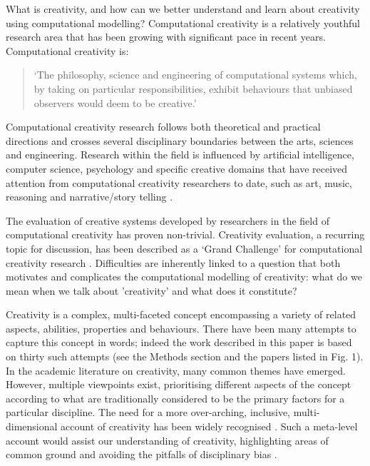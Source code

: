 \documentclass[10pt,letterpaper]{article}
\begin{document}
What is creativity, and how can we better understand and learn about creativity using computational modelling? Computational creativity is a relatively youthful research area that has been growing with significant pace in recent years. Computational creativity is: 
\begin{quote}`The philosophy, science and engineering of computational systems which, by taking on particular responsibilities, exhibit behaviours that unbiased observers would deem to be creative.' 
\cite[p. 21]{coltonwiggins12}
\end{quote}

Computational creativity research follows both theoretical and practical directions and crosses several disciplinary boundaries between the arts, sciences and engineering. Research within the field is influenced by artificial intelligence, computer science, psychology and specific creative domains that have received attention from computational creativity researchers to date, such as art, music, reasoning and narrative/story telling \cite[provide examples]{colton08,widmerAIM09,leon10MM,perezyperez99}. 

The evaluation of creative systems developed by researchers in the field of computational creativity has proven non-trivial. Creativity evaluation, a recurring topic for discussion, has been described as a `Grand Challenge' for computational creativity research \cite{cardoso09}. Difficulties are inherently linked to a question that both motivates and complicates the computational modelling of creativity: what  do we mean when we talk about 'creativity' and what does it constitute?

Creativity is a complex, multi-faceted concept encompassing a variety of related aspects, abilities, properties and behaviours. There have been many attempts to capture this concept in words; indeed the work described in this paper is based on thirty such attempts (see the Methods section and the papers listed in Fig. 1).  %
In the academic literature on creativity, many common themes have emerged. 
However, multiple viewpoints exist, prioritising different aspects of the concept according to what are traditionally considered to be the primary factors for a particular discipline. 
The need for a more over-arching, inclusive, multi-dimensional account of creativity has been widely recognised \cite{rhodes61,torrance67,plucker04defn,kaufman09}. Such a meta-level account would assist our understanding of creativity, highlighting areas of common ground and avoiding the pitfalls of disciplinary bias \cite{hennessey10,plucker04}.
\end{document}
